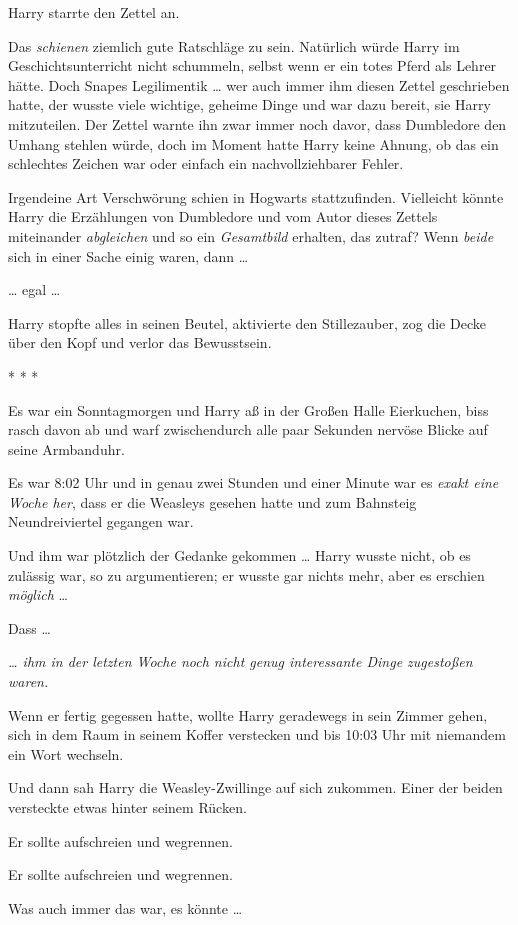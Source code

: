 {Harry starrte den Zettel an.

Das \emph{schienen} ziemlich gute Ratschläge zu sein. Natürlich würde Harry im Geschichtsunterricht nicht schummeln, selbst wenn er ein totes Pferd als Lehrer hätte. Doch Snapes Legilimentik … wer auch immer ihm diesen Zettel geschrieben hatte, der wusste viele wichtige, geheime Dinge und war dazu bereit, sie Harry mitzuteilen. Der Zettel warnte ihn zwar immer noch davor, dass Dumbledore den Umhang stehlen würde, doch im Moment hatte Harry keine Ahnung, ob das ein schlechtes Zeichen war oder einfach ein nachvollziehbarer Fehler.

Irgendeine Art Verschwörung schien in Hogwarts stattzufinden. Vielleicht könnte Harry die Erzählungen von Dumbledore und vom Autor dieses Zettels miteinander \emph{abgleichen} und so ein \emph{Gesamtbild} erhalten, das zutraf? Wenn \emph{beide} sich in einer Sache einig waren, dann …

… egal …

Harry stopfte alles in seinen Beutel, aktivierte den Stillezauber, zog die Decke über den Kopf und verlor das Bewusstsein.

* * *

Es war ein Sonntagmorgen und Harry aß in der Großen Halle Eierkuchen, biss rasch davon ab und warf zwischendurch alle paar Sekunden nervöse Blicke auf seine Armbanduhr.

Es war 8:02 Uhr und in genau zwei Stunden und einer Minute war es \emph{exakt eine Woche her}, dass er die Weasleys gesehen hatte und zum Bahnsteig Neundreiviertel gegangen war.

Und ihm war plötzlich der Gedanke gekommen … Harry wusste nicht, ob es zulässig war, so zu argumentieren; er wusste gar nichts mehr, aber es erschien \emph{möglich} …

Dass …

\emph{… ihm in der letzten Woche noch nicht genug interessante Dinge zugestoßen waren.}

Wenn er fertig gegessen hatte, wollte Harry geradewegs in sein Zimmer gehen, sich in dem Raum in seinem Koffer verstecken und bis 10:03 Uhr mit niemandem ein Wort wechseln.

Und dann sah Harry die Weasley-Zwillinge auf sich zukommen. Einer der beiden versteckte etwas hinter seinem Rücken.

Er sollte aufschreien und wegrennen.

Er sollte aufschreien und wegrennen.

Was auch immer das war, es könnte …

}
